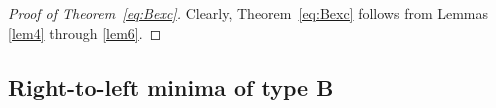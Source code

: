 \documentclass[12pt,reqno]{amsart}
\numberwithin{equation}{section}
\def\x{\mathbf{ x}}
\newtheorem{thm}{Theorem}
\begin{document}
%
\begin{proof}[Proof of Theorem~\ref{eq:Bexc}]
Clearly,  Theorem~\ref{eq:Bexc} follows from
Lemmas \ref{lem4} through \ref{lem6}. 
\end{proof}

\subsection{Right-to-left minima of type B}
\end{document}
